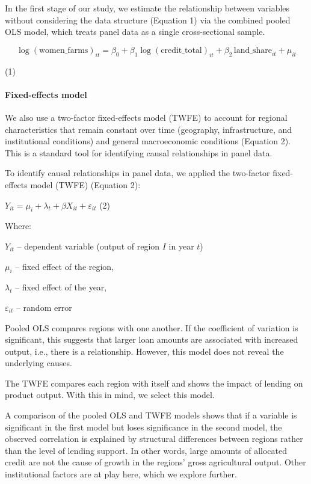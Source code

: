 ﻿\documentclass[pdflatex,sn-mathphys-ay]{sn-jnl}
\begin{document}
In the first stage of our study, we estimate the relationship between
variables without considering the data structure (Equation 1) via the
combined pooled OLS model, which treats panel data as a single
cross-sectional sample.

$$
\log(\text{women\_farms})_{it} = \beta_0 + \beta_1 \log(\text{credit\_total})_{it} + \beta_2 \, \text{land\_share}_{it} + \mu_{it}
$$

(1)

\paragraph{Fixed-effects model}

We also use a two-factor fixed-effects model (TWFE) to account for
regional characteristics that remain constant over time (geography,
infrastructure, and institutional conditions) and general macroeconomic
conditions (Equation 2). This is a standard tool for identifying causal
relationships in panel data.

To identify causal relationships in panel data, we applied the
two-factor fixed-effects model (TWFE) (Equation 2):

$Y_{it} = \mu_i + \lambda_t + \beta X_{it} + \varepsilon_{it}$ (2)

Where:

$Y_{it}$ -- dependent variable (output of region $I$ in year $t$)

$\mu_i$ -- fixed effect of the region,

$\lambda_t$ -- fixed effect of the year,

$\varepsilon_{it}$ -- random error

Pooled OLS compares regions with one another. If the coefficient of
variation is significant, this suggests that larger loan amounts are
associated with increased output, i.e., there is a relationship.
However, this model does not reveal the underlying causes.

The TWFE compares each region with itself and shows the impact of
lending on product output. With this in mind, we select this model.

A comparison of the pooled OLS and TWFE models shows that if a variable
is significant in the first model but loses significance in the second
model, the observed correlation is explained by structural differences
between regions rather than the level of lending support. In other
words, large amounts of allocated credit are not the cause of growth in the regions'
gross agricultural output. Other institutional factors are at play here,
which we explore further.
\end{document}
